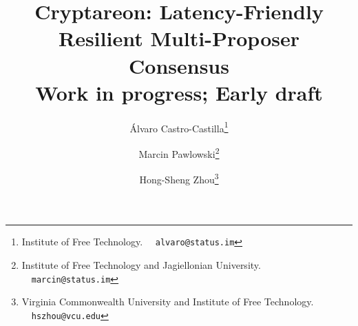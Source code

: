 \documentclass[11pt]{article}
\begin{document}
\title{
Cryptareon: Latency-Friendly Resilient Multi-Proposer Consensus
\\
{\small {\sc Work in progress; Early draft}}
}
\author{
Álvaro Castro-Castilla\footnote{Institute of Free Technology. \ \ \texttt{alvaro@status.im}}
\and
Marcin Pawlowski\footnote{Institute of Free Technology and Jagiellonian University. \ \ \texttt{marcin@status.im}}
\and
Hong-Sheng Zhou\footnote{Virginia Commonwealth University and Institute of Free Technology. \ \ \texttt{hszhou@vcu.edu}}
}

\maketitle





\setcounter{tocdepth}{2}
\setcounter{secnumdepth}{3}
\pagestyle{plain}




\newpage
\small
\tableofcontents
\normalsize

\newpage
{}







%








\end{document}

